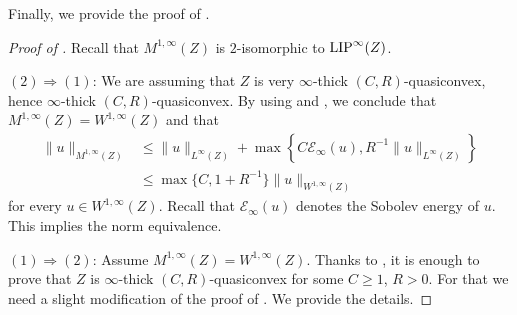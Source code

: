 \documentclass[reqno]{amsart}
\newcommand{\LIP}{{\rm LIP}}
\numberwithin{equation}{section}
\theoremstyle{remark}
\begin{document}
Finally, we provide the proof of .
\begin{proof}[Proof of ]
    Recall that  $M^{1,\infty}(Z)$ is $2$-isomorphic to $\LIP^{\infty}(Z)$.

    $(2)\Rightarrow (1)$: We are assuming that $Z$ is very $\infty$-thick $(C,R)$-quasiconvex, hence $\infty$-thick $(C,R)$-quasiconvex. By using  and , we conclude that $M^{1,\infty}(Z)=W^{1,\infty}(Z)$ and that
    \begin{align*}
       \| u \|_{ M^{1,\infty}(Z) }
       &\leq
       \|u\|_{ L^{\infty}(Z) } + \max\left\{ C \mathscr{E}_{\infty}(u), R^{-1}\|u\|_{L^{\infty}(Z)} \right\}
       \\
       &\leq
       \max \{C, 1+R^{-1}\}
       \| u \|_{  W^{1,\infty}(Z) }
   \end{align*}
    for every $u \in W^{1,\infty}(Z)$. Recall that $\mathscr{E}_{\infty}(u)$ denotes the Sobolev energy of $u$. This implies the norm equivalence.
   
    
    $(1)\Rightarrow (2)$: Assume $M^{1,\infty}(Z)=W^{1,\infty}(Z) $. Thanks to , it is enough to prove that $Z$ is $\infty$-thick $(C,R)$-quasiconvex for some $C\geq 1$, $R>0$. For that we need a slight modification of the proof of . We provide the details. 
      

\end{proof}
\end{document}
